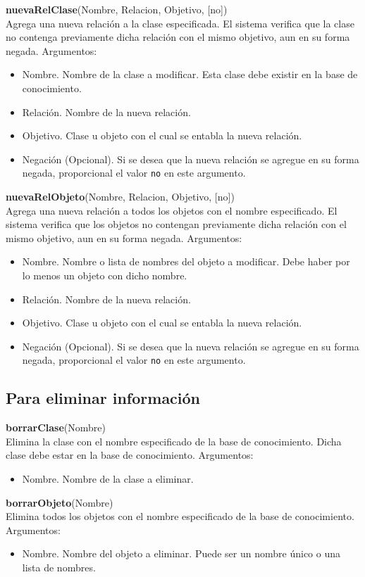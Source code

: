 \documentclass[11pt]{article}
\newcommand{\comando}[2]{
    \textbf{#1}(#2)\\
}
\newenvironment{args}{
    \newline
    Argumentos:
    \begin{itemize}
}{
    \end{itemize}
    \bigskip
}
\begin{document}
\comando{nuevaRelClase}{Nombre, Relacion, Objetivo, [no]}
Agrega una nueva relación a la clase especificada. El sistema verifica que la clase no contenga previamente dicha relación con el mismo objetivo, aun en su forma negada.
\begin{args}
    \item Nombre. Nombre de la clase a modificar. Esta clase debe existir en la base de conocimiento.
    \item Relación. Nombre de la nueva relación.
    \item Objetivo. Clase u objeto con el cual se entabla la nueva relación.
    \item Negación (Opcional). Si se desea que la nueva relación se agregue en su forma negada, proporcional el valor \texttt{no} en este argumento.
\end{args}

\comando{nuevaRelObjeto}{Nombre, Relacion, Objetivo, [no]}
Agrega una nueva relación a todos los objetos con el nombre especificado. El sistema verifica que los objetos no contengan previamente dicha relación con el mismo objetivo, aun en su forma negada.
\begin{args}
    \item Nombre. Nombre o lista de nombres del objeto a modificar. Debe haber por lo menos un objeto con dicho nombre.
    \item Relación. Nombre de la nueva relación.
    \item Objetivo. Clase u objeto con el cual se entabla la nueva relación.
    \item Negación (Opcional). Si se desea que la nueva relación se agregue en su forma negada, proporcional el valor \texttt{no} en este argumento.
\end{args}

\subsection{Para eliminar información}

\comando{borrarClase}{Nombre}
Elimina la clase con el nombre especificado de la base de conocimiento. Dicha clase debe estar en la base de conocimiento.
\begin{args}
    \item Nombre. Nombre de la clase a eliminar.
\end{args}

\comando{borrarObjeto}{Nombre}
Elimina todos los objetos con el nombre especificado de la base de conocimiento.
\begin{args}
    \item Nombre. Nombre del objeto a eliminar. Puede ser un nombre único o una lista de nombres.
\end{args}
\end{document}
